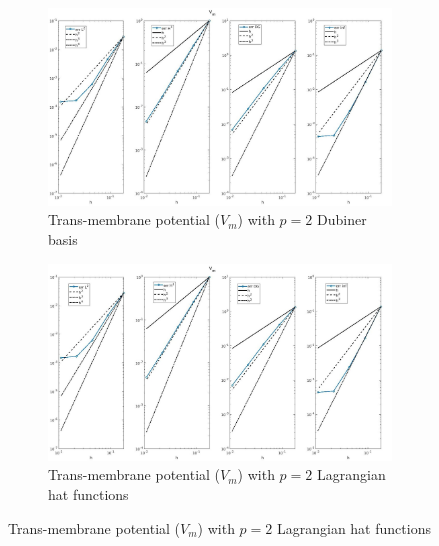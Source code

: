 \documentclass[a4paper,11pt]{article}
\begin{document}
\begin{figure}[H]
\caption{Comparison of the trans-membrane potential ($V_m$)}
\label{Vm_2}
\begin{subfigure}{\textwidth}
\begin{center}
\includegraphics[width = \textwidth]{./errors/D2_Vm_1.jpg}
\caption{Trans-membrane potential ($V_m$) with $p=2$ Dubiner basis}
\end{center}
\end{subfigure}
\begin{subfigure}{\textwidth}
\begin{center}
\includegraphics[width =\textwidth]{./errors/P2_Vm_1.jpg}
\caption{Trans-membrane potential ($V_m$) with $p=2$ Lagrangian hat functions}
\end{center}
\end{subfigure}
\end{figure}
\end{document}
